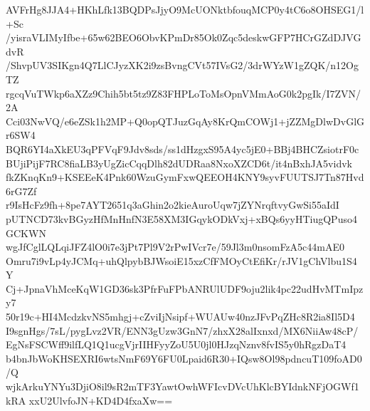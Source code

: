 AVFrHg8JJA4+HKhLfk13BQDPsJjyO9McUONktbfouqMCP0y4tC6o8OHSEG1/l+Sc
/yisraVLIMyIfbe+65w62BEO6ObvKPmDr85Ok0Zqc5deskwGFP7HCrGZdDJVGdvR
/ShvpUV3SIKgn4Q7LlCJyzXK2i9zsBvngCVt57IVsG2/3drWYzW1gZQK/n12OgTZ
rgcqVuTWkp6aXZz9Chih5bt5tz9Z83FHPLoToMsOpnVMmAoG0k2pgIk/I7ZVN/2A
Cci03NwVQ/e6eZSk1h2MP+Q0opQTJuzGqAy8KrQmCOWj1+jZZMgDlwDvGlGr6SW4
BQR6YI4aXkEU3qPFVqF9Jdv8sds/ss1dHzgxS95A4yc5jE0+BBj4BHCZsiotrF0c
BUjiPijF7RC8fiaLB3yUgZicCqqDlh82dUDRaa8NxoXZCD6t/it4nBxhJA5vidvk
fkZKnqKn9+KSEEeK4Pnk60WzuGymFxwQEEOH4KNY9syvFUUTSJ7Tn87Hvd6rG7Zf
r9IsHcFz9fh+8pe7AYT2651q3aGhin2o2kieAuroUqw7jZYNrqftvyGwSi55aIdI
pUTNCD73kvBGyzHfMnHnfN3E58XM3IGqykODkVxj+xBQs6yyHTiugQPuso4GCKWN
wgJfCglLQLqiJFZ4lO0i7e3jPt7Pl9V2rPwIVcr7e/59Jl3m0nsomFzA5c44mAE0
Omru7i9vLp4yJCMq+uhQlpybBJWsoiE15xzCfFMOyCtEfiKr/rJV1gChVlbu1S4Y
Cj+JpnaVhMceKqW1GD36sk3PfrFuFPbANRUlUDF9oju2lik4pc22udHvMTmIpzy7
50r19c+HI4McdzkvNS5mhgj+cZviIjNsipf+WUAUw40nzJFvPqZHc8R2ia8Il5D4
I9sgnHgs/7sL/pygLvz2VR/ENN3gUzw3GnN7/zhxX28alIxnxd/MX6NiiAw48cP/
EgNsFSCWff9ilfLQ1Q1ucgVjrIIHFyyZoU5U0jl0HJzqNznv8fvIS5y0hRgzDaT4
b4bnJbWoKHSEXRI6wtsNmF69Y6FU0Lpaid6R30+IQsw8Ol98pdncuT109foAD0/Q
wjkArkuYNYu3DjiO8il9sR2mTF3YawtOwhWFIcvDVcUhKlcBYIdnkNFjOGWf1kRA
xxU2UlvfoJN+KD4D4fxaXw==
